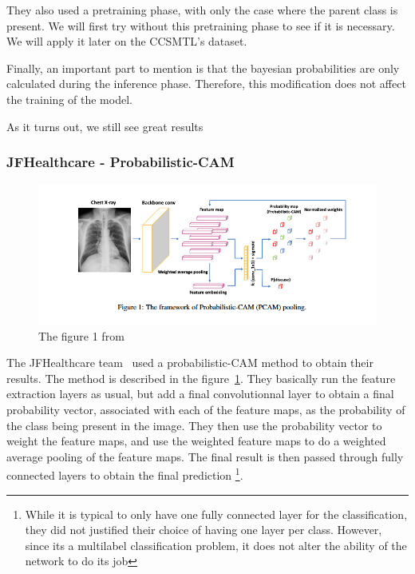 \documentclass[11pt]{article}
\begin{document}
            They also used a pretraining phase, with only the case where the parent class is present. We will first try without this pretraining phase to see if it is necessary. We will apply it later
            on the CCSMTL's dataset.

            Finally, an important part to mention is that the bayesian probabilities are only calculated during the inference phase. Therefore, this modification does not affect the training of the model.

            As it turns out, we still see great results

        \subsubsection{JFHealthcare - Probabilistic-CAM}

            \begin{figure}[H]

                 \centering
                 \includegraphics[width=0.8 \textwidth]{plots/jfhealthcare}
                 \caption{The figure 1 from~\cite{jfhealthcare}}
                 \label{fig:jfhealthcare_probabilistic_cam}

            \end{figure}

            The JFHealthcare team~\cite{jfhealthcare} used a probabilistic-CAM method to obtain their results.
             The method is described in the figure~\ref{fig:jfhealthcare_probabilistic_cam}. They basically run the feature extraction layers as usual, but add a final convolutionnal layer
            to obtain a final probability vector, associated with each of the feature maps, as the probability of the class being present in the image. They then use the probability vector to weight the feature maps, and use the weighted feature maps to do a
            weighted average pooling of the feature maps. The final result is then passed through fully connected layers to obtain the final prediction \footnote{While it is typical to only have one fully connected layer for the classification,
            they did not justified their choice of having one layer per class. However, since its a multilabel classification problem, it does not alter the ability of the network to do its job}.
\end{document}
